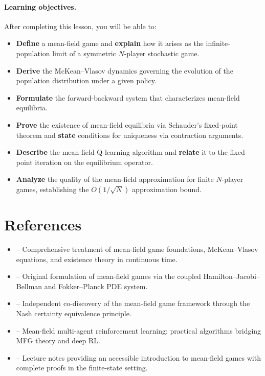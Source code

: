 \documentclass[11pt,a4paper]{article}
\begin{document}
\paragraph{Learning objectives.}
After completing this lesson, you will be able to:
\begin{itemize}[nosep]
  \item \textbf{Define} a mean-field game and \textbf{explain} how
    it arises as the infinite-population limit of a symmetric
    $N$-player stochastic game.
  \item \textbf{Derive} the McKean--Vlasov dynamics governing the
    evolution of the population distribution under a given policy.
  \item \textbf{Formulate} the forward-backward system that
    characterizes mean-field equilibria.
  \item \textbf{Prove} the existence of mean-field equilibria via
    Schauder's fixed-point theorem and \textbf{state} conditions
    for uniqueness via contraction arguments.
  \item \textbf{Describe} the mean-field Q-learning algorithm and
    \textbf{relate} it to the fixed-point iteration on the
    equilibrium operator.
  \item \textbf{Analyze} the quality of the mean-field approximation
    for finite $N$-player games, establishing the
    $O(1/\sqrt{N})$ approximation bound.
\end{itemize}


\section{References}
\label{sec:references}

\begin{itemize}
  \item \citet[Chapters 1--5]{carmona2018i} -- Comprehensive
    treatment of mean-field game foundations, McKean--Vlasov
    equations, and existence theory in continuous time.
  \item \citet{lasry2007} -- Original formulation of mean-field
    games via the coupled Hamilton--Jacobi--Bellman and
    Fokker--Planck PDE system.
  \item \citet{huang2006} -- Independent co-discovery of the
    mean-field game framework through the Nash certainty
    equivalence principle.
  \item \citet{yang2018} -- Mean-field multi-agent reinforcement
    learning: practical algorithms bridging MFG theory and
    deep RL.
  \item \citet{cardaliaguet2010} -- Lecture notes providing an
    accessible introduction to mean-field games with complete
    proofs in the finite-state setting.
\end{itemize}
\end{document}
